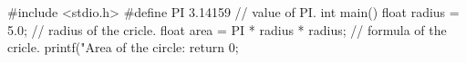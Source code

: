 #include <stdio.h>
#define PI 3.14159 // value of PI.
int main() 
{
   float radius = 5.0; // radius of the cricle.
   float area = PI * radius * radius; // formula of the cricle.
   printf("Area of the circle: %
   return 0;
}
